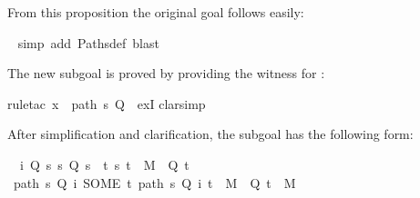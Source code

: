 \begin{isabellebody}
\begin{isamarkuptxt}%
\noindent
From this proposition the original goal follows easily:%
\end{isamarkuptxt}%
\isamarkuptrue%
\ \isamarkupfalse%
{}simp\ add{}\ Paths{}def{}\ blast{}%
\begin{isamarkuptxt}%
\noindent
The new subgoal is proved by providing the witness  for :%
\end{isamarkuptxt}%
\isamarkuptrue%
\isamarkupfalse%
{}rule{}tac\ x\ {}\ {}path\ s\ Q{}\ \ exI{}\isanewline
{}\isamarkupfalse%
{}clarsimp{}%
\begin{isamarkuptxt}%
\noindent
After simplification and clarification, the subgoal has the following form:
\begin{isabelle}%
\ {}{}\ {}i{}\ {}Q\ s{}\ {}s{}\ Q\ s\ {}\ {}{}t{}\ {}s{}\ t{}\ {}\ M\ {}\ Q\ t{}{}\isanewline
{}\ {}path\ s\ Q\ i{}\ SOME\ t{}\ {}path\ s\ Q\ i{}\ t{}\ {}\ M\ {}\ Q\ t{}\ {}\ M\ {}\isanewline

\end{isabelle}
\end{isamarkuptxt}
\end{isabellebody}
